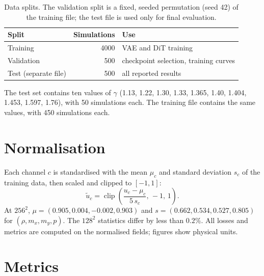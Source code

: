 \begin{table}[htbp]
\centering
\small
\caption{Data splits. The validation split is a fixed, seeded permutation
(seed 42) of the training file; the test file is used only for final
evaluation.}
\label{tab:app_splits}
\begin{tabular}{lrl}
\toprule
Split & Simulations & Use \\
\midrule
Training & 4000 & VAE and DiT training \\
Validation & 500 & checkpoint selection, training curves \\
Test (separate file) & 500 & all reported results \\
\bottomrule
\end{tabular}
\end{table}

The test set contains ten values of $\gamma$ (1.13, 1.22, 1.30, 1.33, 1.365,
1.40, 1.404, 1.453, 1.597, 1.76), with 50 simulations each. The training file
contains the same values, with 450 simulations each.

\section{Normalisation}
\label{app:data_norm}

Each channel $c$ is standardised with the mean $\mu_c$ and standard deviation
$s_c$ of the training data, then scaled and clipped to $[-1,1]$:
\begin{equation}
  \tilde u_c = \operatorname{clip}\!\left(\frac{u_c - \mu_c}{5\,s_c},\,-1,\,1\right).
\end{equation}
At $256^2$, $\mu = (0.905, 0.004, -0.002, 0.903)$ and
$s = (0.662, 0.534, 0.527, 0.805)$ for $(\rho, m_x, m_y, p)$. The $128^2$
statistics differ by less than $0.2\%$. All losses and metrics are computed on
the normalised fields; figures show physical units.

\section{Metrics}
\label{app:data_metrics}

